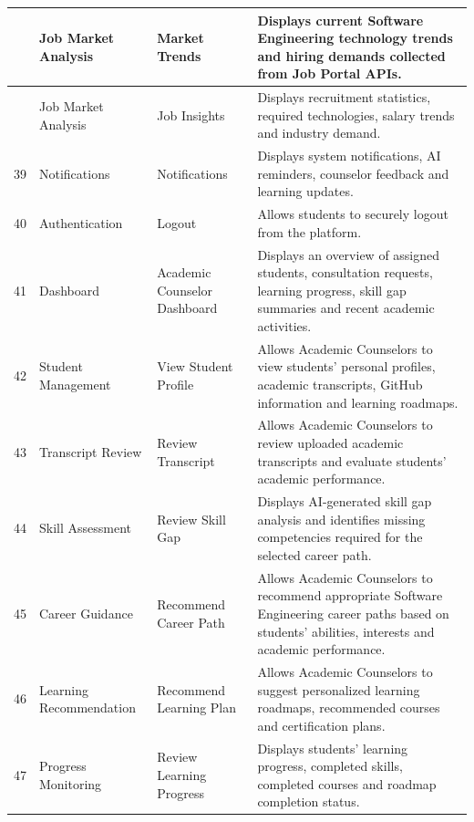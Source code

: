 \begin{longtable}{|>{\centering\arraybackslash}p{0.8cm}|p{3.2cm}|p{3.5cm}|p{8cm}|}
37 &
Job Market Analysis &
Market Trends &
Displays current Software Engineering technology trends and hiring demands collected from Job Portal APIs.
\\
\hline

38 &
Job Market Analysis &
Job Insights &
Displays recruitment statistics, required technologies, salary trends and industry demand.
\\
\hline

39 &
Notifications &
Notifications &
Displays system notifications, AI reminders, counselor feedback and learning updates.
\\
\hline

40 &
Authentication &
Logout &
Allows students to securely logout from the platform.
\\
\hline

41 &
Dashboard &
Academic Counselor Dashboard &
Displays an overview of assigned students, consultation requests, learning progress, skill gap summaries and recent academic activities.
\\
\hline

42 &
Student Management &
View Student Profile &
Allows Academic Counselors to view students' personal profiles, academic transcripts, GitHub information and learning roadmaps.
\\
\hline

43 &
Transcript Review &
Review Transcript &
Allows Academic Counselors to review uploaded academic transcripts and evaluate students' academic performance.
\\
\hline

44 &
Skill Assessment &
Review Skill Gap &
Displays AI-generated skill gap analysis and identifies missing competencies required for the selected career path.
\\
\hline

45 &
Career Guidance &
Recommend Career Path &
Allows Academic Counselors to recommend appropriate Software Engineering career paths based on students' abilities, interests and academic performance.
\\
\hline

46 &
Learning Recommendation &
Recommend Learning Plan &
Allows Academic Counselors to suggest personalized learning roadmaps, recommended courses and certification plans.
\\
\hline

47 &
Progress Monitoring &
Review Learning Progress &
Displays students' learning progress, completed skills, completed courses and roadmap completion status.
\\
\hline


\end{longtable}
